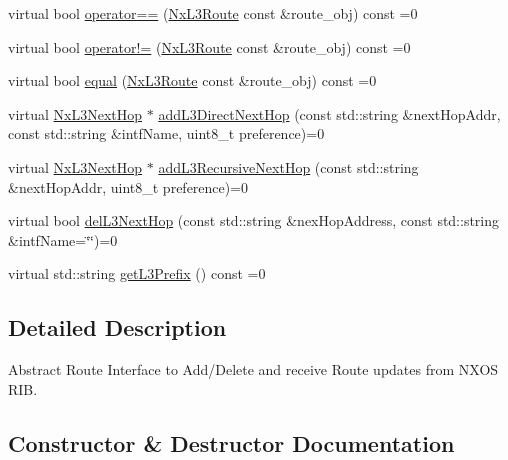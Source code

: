 \begin{DoxyCompactItemize}
virtual bool \mbox{\hyperlink{classnxos_1_1_nx_l3_route_a1680de6899caf8fa1be3ecfad131cd25}{operator==}} (\mbox{\hyperlink{classnxos_1_1_nx_l3_route}{Nx\+L3\+Route}} const \&route\+\_\+obj) const =0
\item 
virtual bool \mbox{\hyperlink{classnxos_1_1_nx_l3_route_a945f75e6656623cbf8cf23b6ab7e01d3}{operator!=}} (\mbox{\hyperlink{classnxos_1_1_nx_l3_route}{Nx\+L3\+Route}} const \&route\+\_\+obj) const =0
\item 
virtual bool \mbox{\hyperlink{classnxos_1_1_nx_l3_route_a6dc5e111e8e8ad48aa028fc65cc483b9}{equal}} (\mbox{\hyperlink{classnxos_1_1_nx_l3_route}{Nx\+L3\+Route}} const \&route\+\_\+obj) const =0
\item 
virtual \mbox{\hyperlink{classnxos_1_1_nx_l3_next_hop}{Nx\+L3\+Next\+Hop}} $\ast$ \mbox{\hyperlink{classnxos_1_1_nx_l3_route_a7ae92c958f54c6e85579eb6ef81f30b3}{add\+L3\+Direct\+Next\+Hop}} (const std\+::string \&next\+Hop\+Addr, const std\+::string \&intf\+Name, uint8\+\_\+t preference)=0
\item 
virtual \mbox{\hyperlink{classnxos_1_1_nx_l3_next_hop}{Nx\+L3\+Next\+Hop}} $\ast$ \mbox{\hyperlink{classnxos_1_1_nx_l3_route_a8733985ca139f4d33215f032c4932be7}{add\+L3\+Recursive\+Next\+Hop}} (const std\+::string \&next\+Hop\+Addr, uint8\+\_\+t preference)=0
\item 
virtual bool \mbox{\hyperlink{classnxos_1_1_nx_l3_route_a8c0708c54d5bb8ce94f80e0edd43880c}{del\+L3\+Next\+Hop}} (const std\+::string \&nex\+Hop\+Address, const std\+::string \&intf\+Name=\char`\"{}\char`\"{})=0
\item 
virtual std\+::string \mbox{\hyperlink{classnxos_1_1_nx_l3_route_acff8f87abd7dcdc002c97a0ca04bf815}{get\+L3\+Prefix}} () const =0
\end{DoxyCompactItemize}


\subsection{Detailed Description}
Abstract Route Interface to Add/\+Delete and receive Route updates from N\+X\+OS R\+IB. 

\subsection{Constructor \& Destructor Documentation}
\mbox{\label{classnxos_1_1_nx_l3_route_abb3762fb6629ba1900e877555cbb69dc}} 

